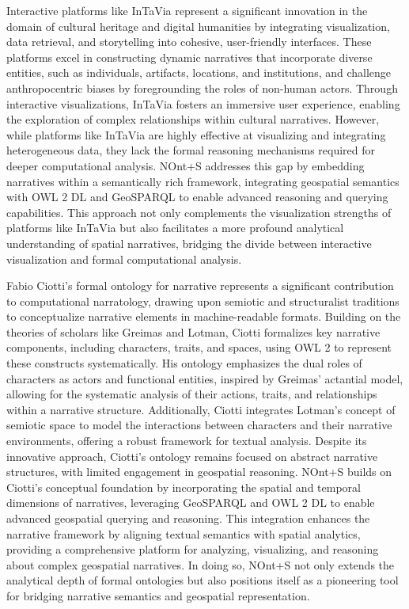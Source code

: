 Interactive platforms like InTaVia \cite{kusnickEveryThingCan2024} represent a significant innovation in the domain of cultural heritage and digital humanities by integrating visualization, data retrieval, and storytelling into cohesive, user-friendly interfaces. These platforms excel in constructing dynamic narratives that incorporate diverse entities, such as individuals, artifacts, locations, and institutions, and challenge anthropocentric biases by foregrounding the roles of non-human actors. Through interactive visualizations, InTaVia fosters an immersive user experience, enabling the exploration of complex relationships within cultural narratives. However, while platforms like InTaVia are highly effective at visualizing and integrating heterogeneous data, they lack the formal reasoning mechanisms required for deeper computational analysis. NOnt+S addresses this gap by embedding narratives within a semantically rich framework, integrating geospatial semantics with OWL 2 DL and GeoSPARQL to enable advanced reasoning and querying capabilities. This approach not only complements the visualization strengths of platforms like InTaVia but also facilitates a more profound analytical understanding of spatial narratives, bridging the divide between interactive visualization and formal computational analysis.

Fabio Ciotti's formal ontology for narrative \cite{ciottiFormalOntologyNarrative2016} represents a significant contribution to computational narratology, drawing upon semiotic and structuralist traditions to conceptualize narrative elements in machine-readable formats. Building on the theories of scholars like Greimas and Lotman, Ciotti formalizes key narrative components, including characters, traits, and spaces, using OWL 2 to represent these constructs systematically. His ontology emphasizes the dual roles of characters as actors and functional entities, inspired by Greimas' actantial model, allowing for the systematic analysis of their actions, traits, and relationships within a narrative structure. Additionally, Ciotti integrates Lotman's concept of semiotic space to model the interactions between characters and their narrative environments, offering a robust framework for textual analysis. Despite its innovative approach, Ciotti's ontology remains focused on abstract narrative structures, with limited engagement in geospatial reasoning. NOnt+S builds on Ciotti's conceptual foundation by incorporating the spatial and temporal dimensions of narratives, leveraging GeoSPARQL and OWL 2 DL to enable advanced geospatial querying and reasoning. This integration enhances the narrative framework by aligning textual semantics with spatial analytics, providing a comprehensive platform for analyzing, visualizing, and reasoning about complex geospatial narratives. In doing so, NOnt+S not only extends the analytical depth of formal ontologies but also positions itself as a pioneering tool for bridging narrative semantics and geospatial representation.


